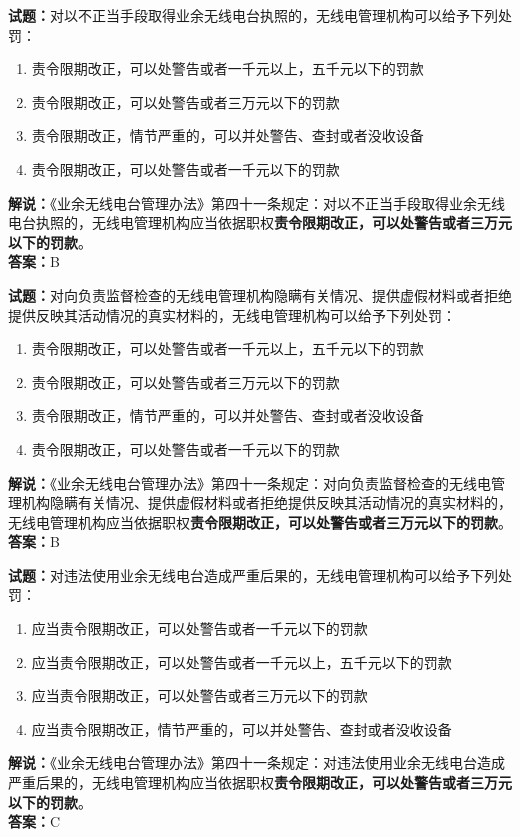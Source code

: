 \documentclass{ctexbook}
\begin{document}
\bigskip


\noindent\textbf{试题：}对以不正当手段取得业余无线电台执照的，无线电管理机构可以给予下列处罚：
\begin{enumerate}[leftmargin=3em]
	\item 责令限期改正，可以处警告或者一千元以上，五千元以下的罚款
	\item 责令限期改正，可以处警告或者三万元以下的罚款
	\item 责令限期改正，情节严重的，可以并处警告、查封或者没收设备
	\item 责令限期改正，可以处警告或者一千元以下的罚款
\end{enumerate}
\noindent\textbf{解说：}《业余无线电台管理办法》第四十一条规定：对以不正当手段取得业余无线电台执照的，无线电管理机构应当依据职权\textbf{责令限期改正，可以处警告或者三万元以下的罚款}。\\\textbf{答案：}B

\bigskip


\noindent\textbf{试题：}对向负责监督检查的无线电管理机构隐瞒有关情况、提供虚假材料或者拒绝提供反映其活动情况的真实材料的，无线电管理机构可以给予下列处罚：
\begin{enumerate}[leftmargin=3em]
	\item 责令限期改正，可以处警告或者一千元以上，五千元以下的罚款
	\item 责令限期改正，可以处警告或者三万元以下的罚款
	\item 责令限期改正，情节严重的，可以并处警告、查封或者没收设备
	\item 责令限期改正，可以处警告或者一千元以下的罚款
\end{enumerate}
\noindent\textbf{解说：}《业余无线电台管理办法》第四十一条规定：对向负责监督检查的无线电管理机构隐瞒有关情况、提供虚假材料或者拒绝提供反映其活动情况的真实材料的，无线电管理机构应当依据职权\textbf{责令限期改正，可以处警告或者三万元以下的罚款}。\\\textbf{答案：}B

\bigskip


\noindent\textbf{试题：}对违法使用业余无线电台造成严重后果的，无线电管理机构可以给予下列处罚：
\begin{enumerate}[leftmargin=3em]
	\item 应当责令限期改正，可以处警告或者一千元以下的罚款
	\item 应当责令限期改正，可以处警告或者一千元以上，五千元以下的罚款
	\item 应当责令限期改正，可以处警告或者三万元以下的罚款
	\item 应当责令限期改正，情节严重的，可以并处警告、查封或者没收设备
\end{enumerate}
\noindent\textbf{解说：}《业余无线电台管理办法》第四十一条规定：对违法使用业余无线电台造成严重后果的，无线电管理机构应当依据职权\textbf{责令限期改正，可以处警告或者三万元以下的罚款}。\\\textbf{答案：}C
\end{document}
